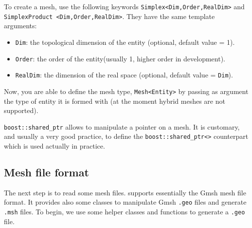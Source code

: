 To create a mesh, use the following keywords \lstinline!Simplex<Dim,Order,RealDim>!  and \\
\lstinline!SimplexProduct <Dim,Order,RealDim>!. They have the same template
arguments:
\begin{itemize}
\item \lstinline!Dim!: the topological dimension of the entity (optional, default value = 1).
\item \lstinline!Order!: the order of the entity(usually 1, higher order in development).
\item \lstinline!RealDim!: the dimension of the real space (optional, default value = \lstinline!Dim!).
\end{itemize}




Now, you are able to define the mesh type, \lstinline!Mesh<Entity>! by passing as
argument the type of entity it is formed with (at the moment hybrid
meshes are not supported).



\lstinline!boost::shared_ptr! allows to manipulate a pointer on a mesh. It is
customary, and usually a very good practice, to define the
\lstinline!boost::shared_ptr<>!  counterpart which is used actually in practice.


%

\subsection{Mesh file format}
The next step is to read some mesh files. \feel supports essentially the Gmsh
mesh file format. It provides also some classes to manipulate Gmsh
\lstinline!.geo! files and generate \lstinline!.msh! files. To begin, we use
some helper classes and functions to generate a \lstinline!.geo! file.

